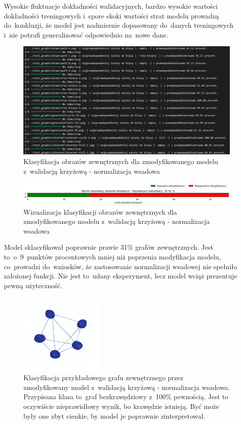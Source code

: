 Wysokie fluktuacje dokładności walidacyjnych, bardzo wysokie wartości dokładności treningowych
i~spore skoki wartości strat modelu prowadzą do~konkluzji,
że model jest nadmiernie dopasowany do~danych treningowych i~nie potrafi generalizować odpowiednio na~nowe dane.

\begin{figure}[ht]
	\centering
	\includegraphics[width=15.5cm]{resources/tests/images/v4/crossvalid_2_txt.png}
	\caption{Klasyfikacja obrazów zewnętrznych dla zmodyfikowanego modelu z~walidacją krzyżową - normalizacja wsadowa}
	\label{Fig:tests-cv-2b}
\end{figure}
\FloatBarrier

\begin{figure}[ht]
	\centering
	\includegraphics[width=15.5cm]{resources/tests/images/v4/crossvalid_2_bar.png}
	\caption{Wizualizacja klasyfikacji obrazów zewnętrznych dla zmodyfikowanego modelu z~walidacją krzyżową - normalizacja wsadowa}
	\label{Fig:tests-cv-2c}
\end{figure}
\FloatBarrier

Model sklasyfikował poprawnie prawie 31\% grafów zewnętrznych.
Jest to~o~9~punktów procentowych mniej niż poprzenia modyfikacja modelu,
co~prowadzi do~wniosków, że zastosowanie normalizacji wsadowej nie spełniło założonej funkcji.
Nie jest to~udany eksperyment, lecz model wciąż prezentuje pewną użyteczność.

\begin{figure}[ht]
	\centering
	\includegraphics[height=4cm]{../graph_classification/test_graphs/drawn/full-8.png}
	\caption{Klasyfikacja przykładowego grafu zewnętrznego przez zmodyfikowany model z~walidacją krzyżową - normalizacja wsadowa.
		Przypisana klasa to~graf bezkrawędziowy z~100\% pewnością.
		Jest to oczywiście nieprawidłowy wynik, bo krawędzie istnieją.
		Być może były one zbyt cienkie, by model je poprawnie zinterpretował.}
	\label{Fig:tests-cv-2d}
\end{figure}
\FloatBarrier

